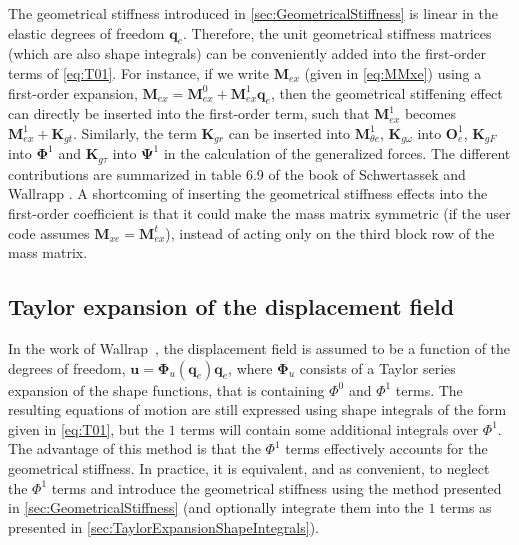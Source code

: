 \documentclass[wes, manuscript]{copernicus}
\renewcommand{\v}[1]{\boldsymbol{#1}}
\newcommand{\m}[1]{\boldsymbol{#1}}
\newcommand{\todoEmmanuel}[1]{{\colorbox{yellow}{TODO Emmanuel:}}{\color{red}{#1}}\colorbox{yellow}{/}}
\begin{document}
The geometrical stiffness introduced in \autoref{sec:GeometricalStiffness} is linear in the elastic degrees of freedom $\v{q}_e$. 
Therefore, the unit geometrical stiffness matrices (which are also shape integrals) can be conveniently added into the first-order terms of \autoref{eq:T01}. 
For instance, if we write $\m{M}_{ex}$ (given in \autoref{eq:MMxe}) using a first-order expansion, $\m{M}_{ex} = \m{M}_{ex}^0 + \m{M}_{ex}^1\v{q}_e$, then the geometrical stiffening effect can directly be inserted into the first-order term, such that $\m{M}_{ex}^1$ becomes $\m{M}_{ex}^1+\m{K}_{gt}$.
Similarly, the term $\m{K}_{gr}$ can be inserted into $\m{M}_{\theta e}^1$, $\m{K}_{g\omega}$ into $\m{O}_e^1$, $\m{K}_{gF}$ into $\m{\Phi}^1$ and $\m{K}_{g\tau}$ into $\m{\Psi}^1$ in the calculation of the generalized forces. 
The different contributions are summarized in table 6.9 of the book of Schwertassek and Wallrapp \citep{Schwertassek:book}. A shortcoming of inserting the geometrical stiffness effects into the first-order coefficient is that it could make the mass matrix symmetric (if the user code assumes $\m{M}_{xe}=\m{M}_{ex}^t$), instead of acting only on the third block row of the mass matrix.

\subsection{Taylor expansion of the displacement field}
\label{sec:TaylorExpansionDisplacement}
In the work of Wallrap~\citep{Wallrapp:1993,Wallrapp:1994}, the displacement field is assumed to be a function of the degrees of freedom, $\v{u}=\m{\Phi}_u(\v{q}_e) \v{q}_e$, where $\m{\Phi}_u$ consists of a Taylor series expansion of the shape functions, that is containing $\Phi^0$ and $\Phi^1$ terms.
The resulting equations of motion are still expressed using shape integrals of the form given in \autoref{eq:T01}, but the $1$ terms will contain some additional integrals over $\Phi^1$. The advantage of this method is that the  $\Phi^1$ terms effectively accounts for the geometrical stiffness. In practice, it is equivalent, and as convenient, to neglect the $\Phi^1$ terms and introduce the geometrical stiffness using the method presented in \autoref{sec:GeometricalStiffness} (and optionally integrate them into the $1$ terms as presented in \autoref{sec:TaylorExpansionShapeIntegrals}).

\end{document}
